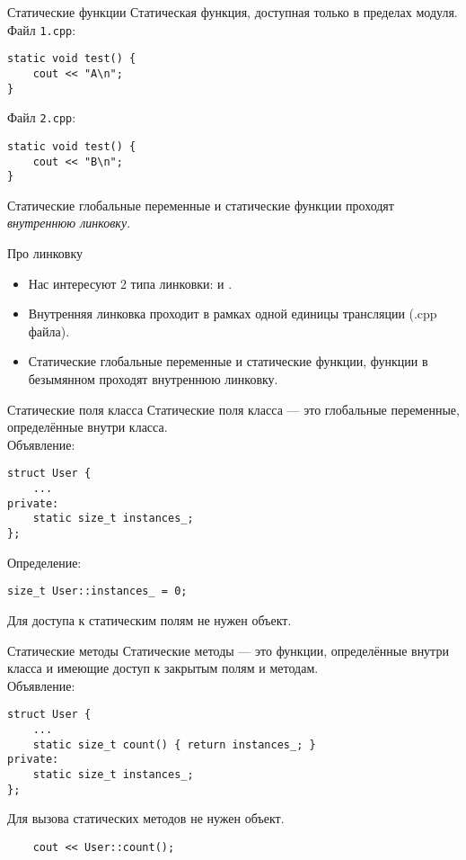 \documentclass{beamer}
\begin{document}
\begin{frame}[fragile]{Статические функции}
    Статическая функция,
    доступная только в пределах модуля.\\[1em]
Файл {\tt 1.cpp}:
    \begin{lstlisting}
static void test() {
    cout << "A\n";
}
    \end{lstlisting}
Файл {\tt 2.cpp}:
    \begin{lstlisting}
static void test() {
    cout << "B\n";
}
    \end{lstlisting}
Статические глобальные переменные и статические функции
проходят {\em внутреннюю линковку}.
\end{frame}

\begin{frame}[fragile]{Про линковку}
    \begin{itemize}
        \item Нас интересуют 2 типа линковки:  и .
        \item Внутренняя линковка проходит в рамках одной единицы трансляции (.cpp файла). \\
        \item Статические глобальные переменные и статические функции, функции в безымянном 
            проходят внутреннюю линковку.
    \end{itemize}
\end{frame}

\begin{frame}[fragile]{Статические поля класса}
    Статические поля класса — это глобальные переменные,
    определённые внутри класса.\\[1em]
Объявление:
\begin{lstlisting}
struct User {
    ...
private:
    static size_t instances_;
}; 
\end{lstlisting}
Определение:
\begin{lstlisting}
size_t User::instances_ = 0;
\end{lstlisting}
Для доступа к статическим полям не нужен объект.
\end{frame}

\begin{frame}[fragile]{Статические методы}
    Статические методы — это функции, определённые внутри класса и имеющие
    доступ к закрытым полям и методам.\\[1em]
Объявление:
\begin{lstlisting}
struct User {
    ...
    static size_t count() { return instances_; }
private:
    static size_t instances_;
}; 
\end{lstlisting}
Для вызова статических методов не нужен объект.
\begin{lstlisting}
    cout << User::count();
\end{lstlisting}
\end{frame}
    
\end{document}
